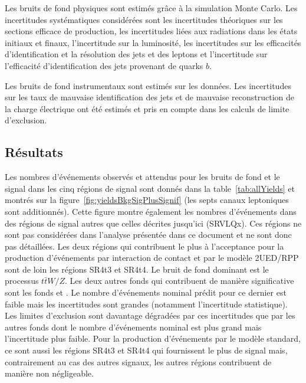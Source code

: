 Les bruits de fond physiques sont estim\'es gr\^ace \`a la simulation Monte Carlo. Les incertitudes syst\'ematiques consid\'er\'ees sont les incertitudes th\'eoriques sur les sections efficace de production, les incertitudes li\'ees aux radiations dans les \'etats initiaux et finaux, l'incertitude sur la luminosit\'e, les incertitudes sur les efficacit\'es d'identification et la r\'esolution des jets et des leptons et l'incertitude sur l'efficacit\'e d'identification des jets provenant de quarks $b$.

Les bruits de fond instrumentaux sont estim\'es sur les donn\'ees. Les incertitudes sur les taux de mauvaise identification des jets et de mauvaise reconstruction de la charge \'electrique ont \'et\'e estim\'es et pris en compte dans les calculs de limite d'exclusion.

\subsection{R\'esultats}
\label{sec:resultatsAnalyseFourTops}

Les nombres d'\'ev\'enements observ\'es et attendus pour les bruits de fond et le signal dans les cinq r\'egions de signal sont donn\'es dans la table~\ref{tab:allYields} et montr\'es sur la figure~\ref{fig:yieldsBkgSigPlusSignif} (les septs canaux leptoniques sont additionn\'es). 
Cette figure montre \'egalement les nombres d'\'ev\'enements dans des r\'egions de signal autres que celles d\'ecrites jusqu'ici (SRVLQx). 
Ces r\'egions ne sont pas consid\'er\'ees dans l'analyse pr\'esent\'ee dans ce document et ne sont donc pas d\'etaill\'ees. 
Les deux r\'egions qui contribuent le plus \`a l'acceptance pour la production d'\'ev\'enements \fourtop{} par interaction de contact et par le mod\`ele 2UED/RPP sont de loin les r\'egions SR4t3 et SR4t4. 
Le bruit de fond dominant est le processus $t\bar{t}W/Z$. 
Les deux autres fonds qui contribuent de mani\`ere significative sont les fonds  et . 
Le nombre d'\'ev\'enements nominal pr\'edit pour ce dernier est faible mais les incertitudes sont grandes (notamment l'incertitude statistique).
Les limites d'exclusion sont davantage d\'egrad\'ees par ces incertitudes que par les autres fonds dont le nombre d'\'ev\'enements nominal est plus grand mais l'incertitude plus faible.
Pour la production d'\'ev\'enements par le mod\`ele standard, ce sont aussi les r\'egions SR4t3 et SR4t4 qui fournissent le plus de signal mais, contrairement au cas des autres signaux, les autres r\'egions contribuent de mani\`ere non n\'egligeable.

